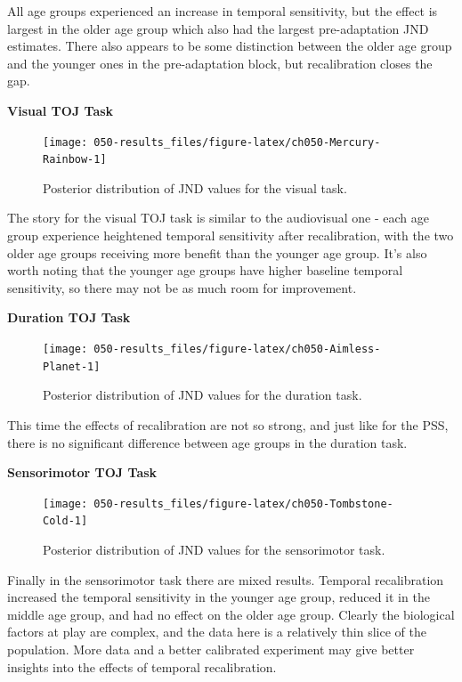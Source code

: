 \documentclass[11pt, oneside, openany]{scrbook}
\begin{document}
All age groups experienced an increase in temporal sensitivity, but the effect is largest in the older age group which also had the largest pre-adaptation JND estimates. There also appears to be some distinction between the older age group and the younger ones in the pre-adaptation block, but recalibration closes the gap.

\textbf{Visual TOJ Task}

\begin{figure}

{\centering \texttt{[image: 050-results\_files/figure-latex/ch050-Mercury-Rainbow-1]} 

}

\caption{Posterior distribution of JND values for the visual task.}\label{fig:ch050-Mercury-Rainbow}
\end{figure}

The story for the visual TOJ task is similar to the audiovisual one - each age group experience heightened temporal sensitivity after recalibration, with the two older age groups receiving more benefit than the younger age group. It's also worth noting that the younger age groups have higher baseline temporal sensitivity, so there may not be as much room for improvement.

\textbf{Duration TOJ Task}

\begin{figure}

{\centering \texttt{[image: 050-results\_files/figure-latex/ch050-Aimless-Planet-1]} 

}

\caption{Posterior distribution of JND values for the duration task.}\label{fig:ch050-Aimless-Planet}
\end{figure}

This time the effects of recalibration are not so strong, and just like for the PSS, there is no significant difference between age groups in the duration task.

\textbf{Sensorimotor TOJ Task}

\begin{figure}

{\centering \texttt{[image: 050-results\_files/figure-latex/ch050-Tombstone-Cold-1]} 

}

\caption{Posterior distribution of JND values for the sensorimotor task.}\label{fig:ch050-Tombstone-Cold}
\end{figure}

Finally in the sensorimotor task there are mixed results. Temporal recalibration increased the temporal sensitivity in the younger age group, reduced it in the middle age group, and had no effect on the older age group. Clearly the biological factors at play are complex, and the data here is a relatively thin slice of the population. More data and a better calibrated experiment may give better insights into the effects of temporal recalibration.
\end{document}
